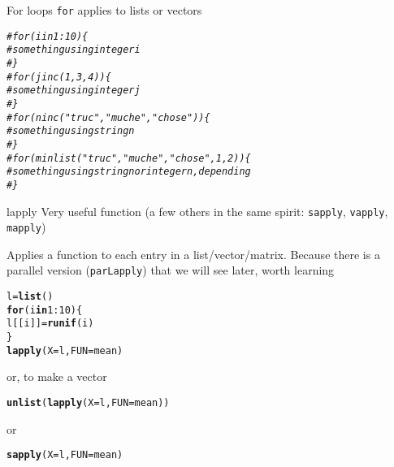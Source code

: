 \documentclass[aspectratio=169]{beamer}\usepackage[]{graphicx}\usepackage[]{xcolor}
\makeatletter
\newcommand{\hlnum}[1]{\textcolor[rgb]{0.686,0.059,0.569}{#1}}%
\newcommand{\hlcom}[1]{\textcolor[rgb]{0.678,0.584,0.686}{\textit{#1}}}%
\newcommand{\hlopt}[1]{\textcolor[rgb]{0,0,0}{#1}}%
\newcommand{\hldef}[1]{\textcolor[rgb]{0.345,0.345,0.345}{#1}}%
\newcommand{\hlkwa}[1]{\textcolor[rgb]{0.161,0.373,0.58}{\textbf{#1}}}%
\newcommand{\hlkwb}[1]{\textcolor[rgb]{0.69,0.353,0.396}{#1}}%
\newcommand{\hlkwc}[1]{\textcolor[rgb]{0.333,0.667,0.333}{#1}}%
\newcommand{\hlkwd}[1]{\textcolor[rgb]{0.737,0.353,0.396}{\textbf{#1}}}%
\newenvironment{kframe}{%
 \def\at@end@of@kframe{}%
 \ifinner\ifhmode%
  \def\at@end@of@kframe{\end{minipage}}%
  \begin{minipage}{\columnwidth}%
 \fi\fi%
 \def\FrameCommand##1{\hskip\@totalleftmargin \hskip-\fboxsep
 \colorbox{shadecolor}{##1}\hskip-\fboxsep
     \hskip-\linewidth \hskip-\@totalleftmargin \hskip\columnwidth}%
 \MakeFramed {\advance\hsize-\width
   \@totalleftmargin\z@ \linewidth\hsize
   \@setminipage}}%
 {\par\unskip\endMakeFramed%
 \at@end@of@kframe}
\newenvironment{knitrout}{}{} %
\makeatother
\begin{document}
\begin{frame}[fragile]{For loops}
\texttt{for} applies to lists or vectors

\begin{knitrout}
\color{fgcolor}\begin{kframe}
\begin{alltt}
\hlcom{# for (i in 1:10) \{}
\hlcom{#   something using integer i}
\hlcom{# \}}
\hlcom{# for (j in c(1,3,4)) \{}
\hlcom{#   something using integer j}
\hlcom{# \}}
\hlcom{# for (n in c("truc", "muche", "chose")) \{}
\hlcom{#   something using string n}
\hlcom{# \}}
\hlcom{# for (m in list("truc", "muche", "chose", 1, 2)) \{}
\hlcom{#   something using string n or integer n, depending}
\hlcom{# \}}
\end{alltt}
\end{kframe}
\end{knitrout}
\end{frame}

\begin{frame}[fragile]{lapply}
Very useful function (a few others in the same spirit: \texttt{sapply}, \texttt{vapply}, \texttt{mapply})

Applies a function to each entry in a list/vector/matrix. Because there is a parallel version (\texttt{parLapply}) that we will see later, worth learning

\begin{knitrout}
\color{fgcolor}\begin{kframe}
\begin{alltt}
\hldef{l} \hlkwb{=} \hlkwd{list}\hldef{()}
\hlkwa{for} \hldef{(i} \hlkwa{in} \hlnum{1}\hlopt{:}\hlnum{10}\hldef{) \{}
        \hldef{l[[i]]} \hlkwb{=} \hlkwd{runif}\hldef{(i)}
\hldef{\}}
\hlkwd{lapply}\hldef{(}\hlkwc{X} \hldef{= l,} \hlkwc{FUN} \hldef{= mean)}
\end{alltt}
\end{kframe}
\end{knitrout}

or, to make a vector

\begin{knitrout}
\color{fgcolor}\begin{kframe}
\begin{alltt}
\hlkwd{unlist}\hldef{(}\hlkwd{lapply}\hldef{(}\hlkwc{X} \hldef{= l,} \hlkwc{FUN} \hldef{= mean))}
\end{alltt}
\end{kframe}
\end{knitrout}

or

\begin{knitrout}
\color{fgcolor}\begin{kframe}
\begin{alltt}
\hlkwd{sapply}\hldef{(}\hlkwc{X} \hldef{= l,} \hlkwc{FUN} \hldef{= mean)}
\end{alltt}
\end{kframe}
\end{knitrout}
\end{frame}
\end{document}
